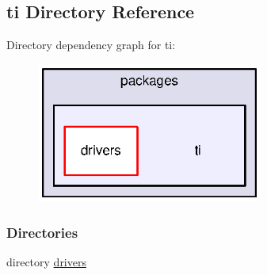 \subsection{ti Directory Reference}
\label{dir_abd11468e5a5b51896344ba99410f96c}
Directory dependency graph for ti\+:
\nopagebreak
\begin{figure}[H]
\begin{center}
\leavevmode
\includegraphics[width=211pt]{dir_abd11468e5a5b51896344ba99410f96c_dep}
\end{center}
\end{figure}
\subsubsection*{Directories}
\begin{DoxyCompactItemize}
\item 
directory \hyperlink{dir_91d6028ef0aa1035242bfefa07cd806e}{drivers}
\end{DoxyCompactItemize}
